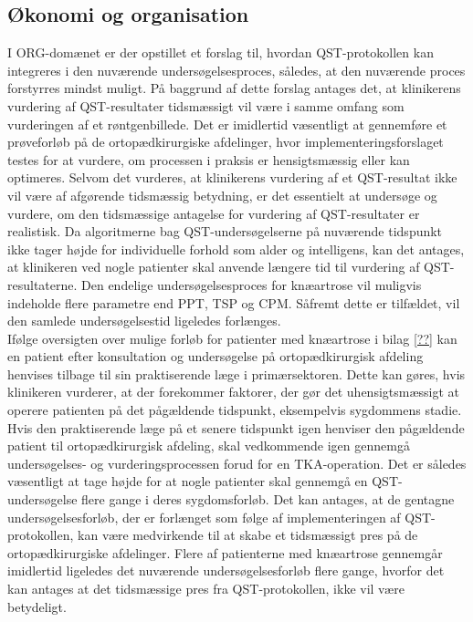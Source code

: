\subsection{Økonomi og organisation} \label {ECO_ORG} %
I ORG-domænet er der opstillet et forslag til, hvordan QST-protokollen kan integreres i den nuværende undersøgelsesproces, således, at den nuværende proces forstyrres mindst muligt. På baggrund af dette forslag antages det, at klinikerens vurdering af QST-resultater tidsmæssigt vil være i samme omfang som vurderingen af et røntgenbillede. Det er imidlertid væsentligt at gennemføre et prøveforløb på de ortopædkirurgiske afdelinger, hvor implementeringsforslaget testes for at vurdere, om processen i praksis er hensigtsmæssig eller kan optimeres. Selvom det vurderes, at klinikerens vurdering af et QST-resultat ikke vil være af afgørende tidsmæssig betydning, er det essentielt at undersøge og vurdere, om den tidsmæssige antagelse for vurdering af QST-resultater er realistisk. Da algoritmerne bag QST-undersøgelserne på nuværende tidspunkt ikke tager højde for individuelle forhold som alder og intelligens, kan det antages, at klinikeren ved nogle patienter skal anvende længere tid til vurdering af QST-resultaterne. Den endelige undersøgelsesproces for knæartrose vil muligvis indeholde flere parametre end PPT, TSP og CPM. Såfremt dette er tilfældet, vil den samlede undersøgelsestid ligeledes forlænges.\\ 
Ifølge oversigten over mulige forløb for patienter med knæartrose i bilag \ref{??} kan en patient efter konsultation og undersøgelse på ortopædkirurgisk afdeling henvises tilbage til sin praktiserende læge i primærsektoren. Dette kan gøres, hvis klinikeren vurderer, at der forekommer faktorer, der gør det uhensigtsmæssigt at operere patienten på det pågældende tidspunkt, eksempelvis sygdommens stadie. Hvis den praktiserende læge på et senere tidspunkt igen henviser den pågældende patient til ortopædkirurgisk afdeling, skal vedkommende igen gennemgå undersøgelses- og vurderingsprocessen forud for en TKA-operation. Det er således væsentligt at tage højde for at nogle patienter skal gennemgå en QST-undersøgelse flere gange i deres sygdomsforløb. Det kan antages, at de gentagne undersøgelsesforløb, der er forlænget som følge af implementeringen af QST-protokollen, kan være medvirkende til at skabe et tidsmæssigt pres på de ortopædkirurgiske afdelinger. Flere af patienterne med knæartrose gennemgår imidlertid ligeledes det nuværende undersøgelsesforløb flere gange, hvorfor det kan antages at det tidsmæssige pres fra QST-protokollen, ikke vil være betydeligt. \\ 
